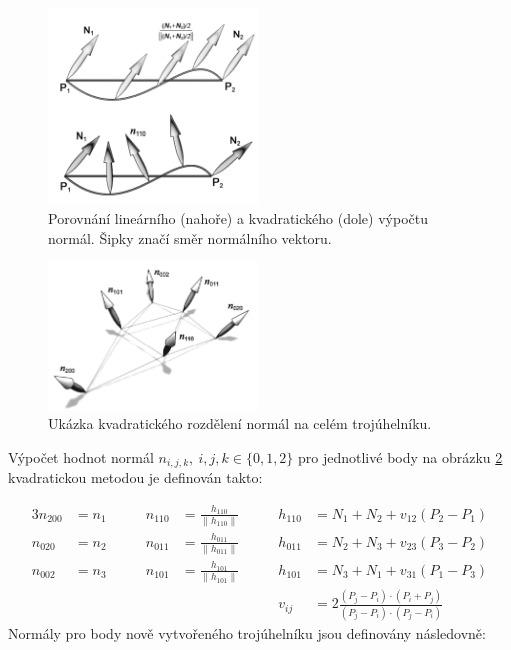 \begin{figure}[H]
	\centering
	\includegraphics[width=15em]{images/pn/pn-triangle-linear-quad-normals.png}
	\caption[caption]{Porovnání lineárního (nahoře) a kvadratického (dole) výpočtu normál. Šipky značí směr normálního vektoru.\footnotemark}
	\label{pn_normal_comparison}
\end{figure}

\begin{figure}[H]
	\centering
	\includegraphics[width=15em]{images/pn/pn-normals.png}
	\caption[caption]{Ukázka kvadratického rozdělení normál na celém trojúhelníku.\footnotemark}
	\label{pn_normal}
\end{figure}



Výpočet hodnot normál $n_{i,j,k},\:i,j,k \in \{0,1,2\}$ pro jednotlivé body na obrázku \ref{pn_normal} kvadratickou metodou je definován takto:

\begin{alignat*}{3}
    n_{200} &= n_{1} \qquad &        
    n_{110} &= \frac{h_{110}}{\|h_{110}\|} \qquad & 
    h_{110} &= N_{1} + N_{2} + v_{12}(P_{2} - P_{1}) \\
    n_{020} &= n_{2} \qquad &    
    n_{011} &= \frac{h_{011}}{\|h_{011}\|} \qquad &
    h_{011} &= N_{2} + N_{3} + v_{23}(P_{3} - P_{2}) \\
    n_{002} &= n_{3} \qquad & 
    n_{101} &= \frac{h_{101}}{\|h_{101}\|} \qquad &
    h_{101} &= N_{3} + N_{1} + v_{31}(P_{1} - P_{3}) \\
    && && v_{ij} &= 2\frac{(P_{j} - P_{i}) \cdot (P_{i} + P_{j})}{(P_{j} - P_{i}) \cdot(P_{j} - P_{i})}
\end{alignat*}
Normály pro body nově vytvořeného trojúhelníku jsou definovány následovně: 

